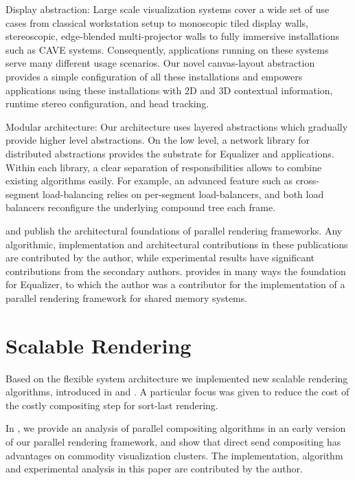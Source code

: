 \begin{compactdesc}
\item[Display abstraction:] Large scale visualization systems cover a wide set
of use cases from classical workstation setup to monoscopic tiled display
walls, stereoscopic, edge-blended multi-projector walls to fully immersive
installations such as CAVE systems. Consequently, applications running on these
systems serve many different usage scenarios. Our novel canvas-layout
abstraction provides a simple configuration of all these installations and
empowers applications using these installations with 2D and 3D contextual
information, runtime stereo configuration, and head tracking.

\item[Modular architecture:] Our architecture uses layered abstractions which
gradually provide higher level abstractions. On the low level, a network
library for distributed abstractions provides the substrate for Equalizer and
applications. Within each library, a clear separation of responsibilities
allows to combine existing algorithms easily. For example, an advanced feature
such as cross-segment load-balancing relies on per-segment load-balancers, and
both load balancers reconfigure the underlying compound tree each frame.

\end{compactdesc}

\cite{EMP:09} and \cite{ESP:18} publish the architectural foundations of
parallel rendering frameworks. Any algorithmic, implementation and
architectural contributions in these publications are contributed by the
author, while experimental results have significant contributions from the
secondary authors. \cite{BRE:05} provides in many ways the foundation for
Equalizer, to which the author was a contributor for the implementation of a
parallel rendering framework for shared memory systems.

\section{Scalable Rendering}

Based on the flexible system architecture we implemented new scalable rendering
algorithms, introduced in \cite{EMP:09} and \cite{ESP:18}. A particular focus
was given to reduce the cost of the costly compositing step for sort-last
rendering.

In \cite{EP:07}, we provide an analysis of parallel compositing algorithms in an
early version of our parallel rendering framework, and show that direct send
compositing has advantages on commodity visualization clusters. The
implementation, algorithm and experimental analysis in this paper are
contributed by the author.

